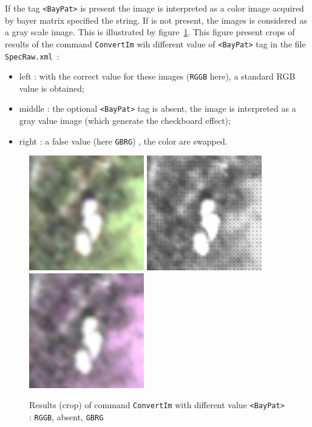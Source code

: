 If the tag {\tt <BayPat>} is present the image is interpreted as a color image acquired by bayer matrix 
specified the string. If is not present, the images is considered  as a gray scale image. This is 
illustrated by figure~\ref{FIG:RawBayer}. This figure present crops of results of the command 
{\tt ConvertIm} wih different value of {\tt <BayPat>} tag in the file {\tt  SpecRaw.xml}~:


\begin{itemize}
       \item left : with the correct value for these images ({\tt RGGB} here), a standard RGB value
             is obtained;

       \item middle : the optional {\tt <BayPat>} tag is absent, the image is interpreted as a gray value
             image (which generate the checkboard effect);

       \item right : a false value (here  {\tt GBRG}) , the color are swapped. 
\end{itemize}

\begin{figure}
\begin{center}
\includegraphics[width=50mm]{FIGS/RawImages/Coul.jpg}
\includegraphics[width=50mm]{FIGS/RawImages/Gray.jpg}
\includegraphics[width=50mm]{FIGS/RawImages/CoulBuged.jpg}
\end{center}
\caption{Results (crop) of command {\tt ConvertIm} with different value {\tt <BayPat>} : {\tt RGGB}, absent, {\tt GBRG}   }
\label{FIG:RawBayer}
\end{figure}


